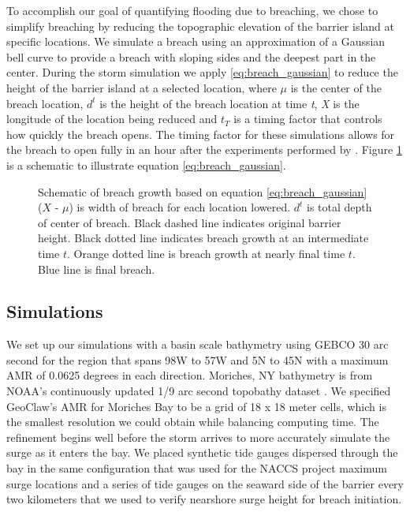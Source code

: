 \documentclass{coastal_paper}
\begin{document}
To accomplish our goal of quantifying flooding due to breaching, we chose to simplify breaching by reducing the topographic elevation of the barrier island at specific locations. We simulate a breach using an approximation of a Gaussian bell curve to provide a breach with sloping sides and the deepest part in the center. During the storm simulation we apply \ref{eq:breach_gaussian} to reduce the height of the barrier island at a selected location, where \emph{$\mu$} is the center of the breach location, \emph{$d^t$} is the height of the breach location at time \emph{t}, \emph{X} is the longitude of the location being reduced and \emph{$t_T$} is a timing factor that controls how quickly the breach opens. The timing factor for these simulations allows for the breach to open fully in an hour after the experiments performed by \citet{Visser1999}. Figure \ref{fig:1} is a schematic to illustrate equation \ref{eq:breach_gaussian}.

\begin{figure}[ht]
    \centering
    \resizebox{\textwidth}{!}{%
            
        }
    \caption{Schematic of breach growth based on equation \ref{eq:breach_gaussian} ($X$ - $\mu$) is width of breach for each location lowered. $d^t$ is total depth of center of breach. Black dashed line indicates original barrier height. Black dotted line indicates breach growth at an intermediate time $t$. Orange dotted line is breach growth at nearly final time $t$. Blue line is final breach.}
    \label{fig:1}
\end{figure}

\subsection{Simulations} 
We set up our simulations with a basin scale bathymetry using GEBCO 30 arc second \citep{weatherall2015new} for the region that spans 98W to 57W and 5N to 45N with a maximum AMR of 0.0625 degrees in each direction. Moriches, NY bathymetry is from NOAA's continuously updated 1/9 arc second topobathy dataset \citep{Cooperative_Institute_for_Research_in_Environmental_Sciences2014-ix}. We specified GeoClaw's AMR for Moriches Bay to be a grid of 18 x 18 meter cells, which is the smallest resolution we could obtain while balancing computing time. The refinement begins well before the storm arrives to more accurately simulate the surge as it enters the bay. We placed synthetic tide gauges dispersed through the bay in the same configuration that was used for the NACCS project maximum surge locations \citep{cialone2015north} and a series of tide gauges on the seaward side of the barrier every two kilometers that we used to verify nearshore surge height for breach initiation.
\end{document}
